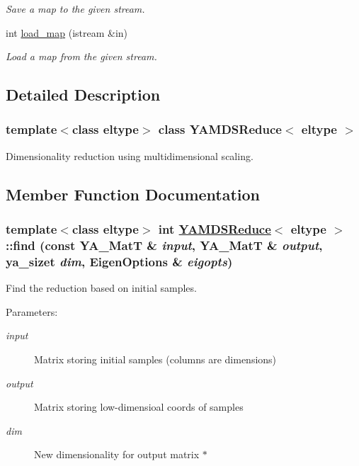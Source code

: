\begin{CompactItemize}
\begin{CompactList}\small\item\em Save a map to the given stream. \item\end{CompactList}\item 
\hypertarget{class_y_a_m_d_s_reduce_a12}{
int \hyperlink{class_y_a_m_d_s_reduce_a12}{load\_\-map} (istream \&in)}
\label{class_y_a_m_d_s_reduce_a12}

\begin{CompactList}\small\item\em Load a map from the given stream. \item\end{CompactList}\end{CompactItemize}


\subsection{Detailed Description}
\subsubsection*{template$<$class eltype$>$ class YAMDSReduce$<$ eltype $>$}

Dimensionality reduction using multidimensional scaling. 



\subsection{Member Function Documentation}
\hypertarget{class_y_a_m_d_s_reduce_a8}{
\subsubsection[find]{\setlength{\rightskip}{0pt plus 5cm}template$<$class eltype$>$ int \hyperlink{class_y_a_m_d_s_reduce}{YAMDSReduce}$<$ eltype $>$::find (const YA\_\-Mat\-T \& {\em input}, YA\_\-Mat\-T \& {\em output}, ya\_\-sizet {\em dim}, Eigen\-Options \& {\em eigopts})}}
\label{class_y_a_m_d_s_reduce_a8}


Find the reduction based on initial samples. 

\begin{Desc}
\item[Parameters:]
\begin{description}
\item[{\em input}]Matrix storing initial samples (columns are dimensions) \item[{\em output}]Matrix storing low-dimensioal coords of samples \item[{\em dim}]New dimensionality for output matrix $\ast$ \end{description}
\end{Desc}


